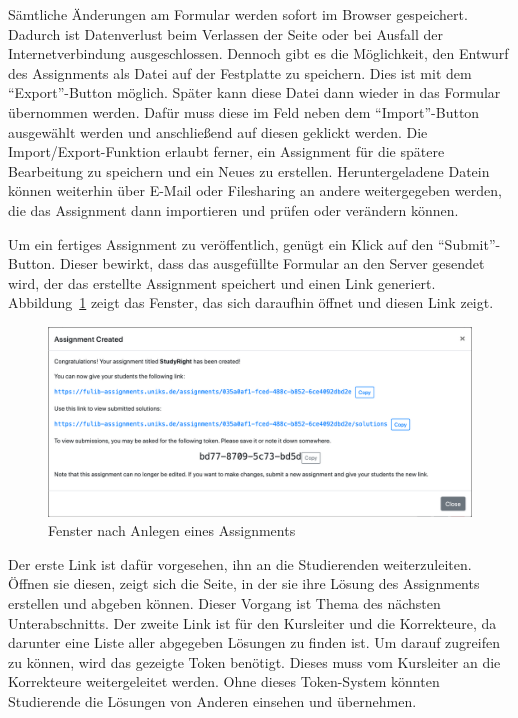 Sämtliche Änderungen am Formular werden sofort im Browser gespeichert.
Dadurch ist Datenverlust beim Verlassen der Seite oder bei Ausfall der Internetverbindung ausgeschlossen.
Dennoch gibt es die Möglichkeit, den Entwurf des Assignments als Datei auf der Festplatte zu speichern.
Dies ist mit dem ``Export''-Button möglich.
Später kann diese Datei dann wieder in das Formular übernommen werden.
Dafür muss diese im Feld neben dem ``Import''-Button ausgewählt werden und anschließend auf diesen geklickt werden.
Die Import/Export-Funktion erlaubt ferner, ein Assignment für die spätere Bearbeitung zu speichern und ein Neues zu erstellen.
Heruntergeladene Datein können weiterhin über E-Mail oder Filesharing an andere weitergegeben werden,
die das Assignment dann importieren und prüfen oder verändern können.

Um ein fertiges Assignment zu veröffentlich, genügt ein Klick auf den ``Submit''-Button.
Dieser bewirkt, dass das ausgefüllte Formular an den Server gesendet wird, der das erstellte Assignment speichert und einen Link generiert.
Abbildung~\ref{fig:create-assignment-success} zeigt das Fenster, das sich daraufhin öffnet und diesen Link zeigt.

\begin{figure}
    \centering
    \includegraphics[width=\textwidth]{chapter/fulib.org/img/create-assignment-success.png}
    \caption{Fenster nach Anlegen eines Assignments}
    \label{fig:create-assignment-success}
\end{figure}

Der erste Link ist dafür vorgesehen, ihn an die Studierenden weiterzuleiten.
Öffnen sie diesen, zeigt sich die Seite, in der sie ihre Lösung des Assignments erstellen und abgeben können.
Dieser Vorgang ist Thema des nächsten Unterabschnitts.
Der zweite Link ist für den Kursleiter und die Korrekteure, da darunter eine Liste aller abgegeben Lösungen zu finden ist.
Um darauf zugreifen zu können, wird das gezeigte Token benötigt.
Dieses muss vom Kursleiter an die Korrekteure weitergeleitet werden.
Ohne dieses Token-System könnten Studierende die Lösungen von Anderen einsehen und übernehmen.


